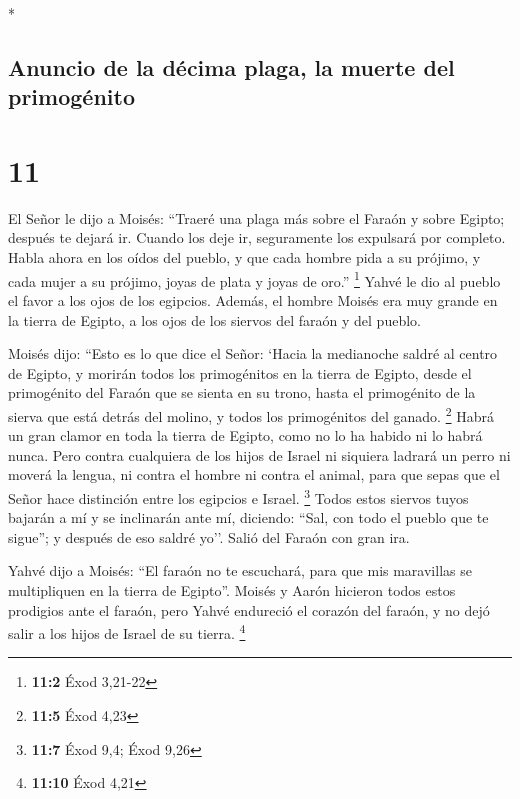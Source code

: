 \begin{paracol}{2}
\begin{otherlanguage}{english}
\end{otherlanguage}

\switchcolumn[0]*

\hypertarget{anuncio-de-la-duxe9cima-plaga-la-muerte-del-primoguxe9nito}{%
\subsection{Anuncio de la décima plaga, la muerte del
primogénito}\label{anuncio-de-la-duxe9cima-plaga-la-muerte-del-primoguxe9nito}}

\hypertarget{section-20}{%
\section{11}\label{section-20}}

 El Señor le dijo a Moisés: ``Traeré una plaga más sobre
el Faraón y sobre Egipto; después te dejará ir. Cuando los deje ir,
seguramente los expulsará por completo.  Habla ahora en
los oídos del pueblo, y que cada hombre pida a su prójimo, y cada mujer
a su prójimo, joyas de plata y joyas de oro.'' \footnote{\textbf{11:2}
  Éxod 3,21-22}  Yahvé le dio al pueblo el favor a los
ojos de los egipcios. Además, el hombre Moisés era muy grande en la
tierra de Egipto, a los ojos de los siervos del faraón y del pueblo.

 Moisés dijo: ``Esto es lo que dice el Señor: `Hacia la
medianoche saldré al centro de Egipto,  y morirán todos
los primogénitos en la tierra de Egipto, desde el primogénito del Faraón
que se sienta en su trono, hasta el primogénito de la sierva que está
detrás del molino, y todos los primogénitos del ganado. \footnote{\textbf{11:5}
  Éxod 4,23}  Habrá un gran clamor en toda la tierra de
Egipto, como no lo ha habido ni lo habrá nunca.  Pero
contra cualquiera de los hijos de Israel ni siquiera ladrará un perro ni
moverá la lengua, ni contra el hombre ni contra el animal, para que
sepas que el Señor hace distinción entre los egipcios e Israel.
\footnote{\textbf{11:7} Éxod 9,4; Éxod 9,26}  Todos estos
siervos tuyos bajarán a mí y se inclinarán ante mí, diciendo: ``Sal, con
todo el pueblo que te sigue''; y después de eso saldré yo''. Salió del
Faraón con gran ira.

 Yahvé dijo a Moisés: ``El faraón no te escuchará, para
que mis maravillas se multipliquen en la tierra de Egipto''.
 Moisés y Aarón hicieron todos estos prodigios ante el
faraón, pero Yahvé endureció el corazón del faraón, y no dejó salir a
los hijos de Israel de su tierra. \footnote{\textbf{11:10} Éxod 4,21}


\end{paracol}
